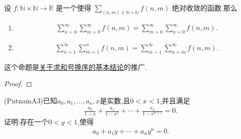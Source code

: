 \documentclass[../../main.tex]{subfiles}
\begin{document}
\begin{theorem}\label{关于无限和的Fubinin定理}
设 \( f: \mathbb{N} \times \mathbb{N} \to \mathbb{R} \) 是一个使得 \(\sum\limits_{(n,m) \in \mathbb{N} \times \mathbb{N}} f(n,m)\) 绝对收敛的函数.那么
\begin{enumerate}[(1)]
\item \begin{align*}
\sum\limits_{n=0}^{\infty}{\sum\limits_{m=0}^{\infty}{f(n,m)}}=\sum\limits_{m=0}^{\infty}{\sum\limits_{n=0}^{\infty}{f(n,m)}.}
\end{align*}

\item \begin{align*}
\sum\limits_{n=1}^{\infty}{\sum\limits_{m=1}^n{f(n,m)}}=\sum\limits_{m=1}^{\infty}{\sum\limits_{n=m}^{\infty}{f(n,m)}}.
\end{align*}
\end{enumerate}
\end{theorem}
\begin{note}
这个命题是\hyperlink{关于求和号换序的基本结论}{关于求和号换序的基本结论}的推广.
\end{note}
\begin{proof}


\end{proof}

\begin{example}
(PutnamA3)已知\(a_0, a_1, \ldots, a_n, x\)是实数,且\(0 < x < 1\),并且满足
\begin{align*}
\frac{a_0}{1 - x}+\frac{a_1}{1 - x^2}+\cdots+\frac{a_n}{1 - x^{n + 1}} = 0.
\nonumber
\end{align*}
证明:存在一个\(0 < y < 1\),使得
\begin{align*}
a_0 + a_1y + \cdots + a_ny^n = 0.
\nonumber
\end{align*}
\end{example}
\end{document}
